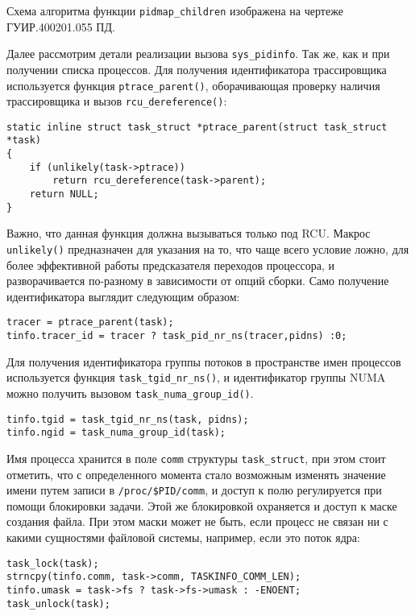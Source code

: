 Схема алгоритма функции \texttt{pidmap\_children} изображена на чертеже
ГУИР.400201.055 ПД.

Далее рассмотрим детали реализации вызова \texttt{sys\_pidinfo}. Так же, как и
при получении списка процессов. Для получения идентификатора трассировщика
используется функция \texttt{ptrace\_parent()}, оборачивающая
проверку наличия трассировщика и вызов
\texttt{rcu\_dereference()}:
\medskip
\begin{lstlisting}[style=cstyle]
static inline struct task_struct *ptrace_parent(struct task_struct *task)
{
	if (unlikely(task->ptrace))
		return rcu_dereference(task->parent);
	return NULL;
}
\end{lstlisting}
\medskip

Важно, что данная функция должна вызываться только под RCU. Макрос
\texttt{unlikely()} предназначен для указания на то, что чаще всего условие
ложно, для более эффективной работы предсказателя переходов процессора, и
разворачивается по-разному в зависимости от опций сборки. Само получение
идентификатора выглядит следующим образом:
\medskip
\begin{lstlisting}[style=cstyle]
tracer = ptrace_parent(task);
tinfo.tracer_id = tracer ? task_pid_nr_ns(tracer,pidns) :0;
\end{lstlisting}
\medskip

Для получения идентификатора группы потоков в пространстве имен процессов
используется функция \texttt{task\_tgid\_nr\_ns()}, и идентификатор группы NUMA
можно получить вызовом \texttt{task\_numa\_group\_id()}.
\medskip
\begin{lstlisting}[style=cstyle]
tinfo.tgid = task_tgid_nr_ns(task, pidns);
tinfo.ngid = task_numa_group_id(task);
\end{lstlisting}
\medskip

Имя процесса хранится в поле \texttt{comm} структуры \texttt{task\_struct}, при
этом стоит отметить, что с определенного момента стало возможным изменять
значение имени путем записи в \texttt{/proc/\$PID/comm}, и доступ к полю
регулируется при помощи блокировки задачи. Этой же блокировкой охраняется и
доступ к маске создания файла. При этом маски может не быть, если процесс не
связан ни с какими сущностями файловой системы, например, если это поток ядра:
\medskip
\begin{lstlisting}[style=cstyle]
task_lock(task);
strncpy(tinfo.comm, task->comm, TASKINFO_COMM_LEN);
tinfo.umask = task->fs ? task->fs->umask : -ENOENT;
task_unlock(task);
\end{lstlisting}
\medskip

